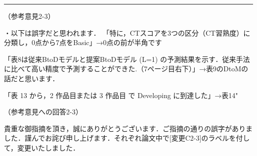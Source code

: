 \documentclass{jarticle} %
\def\subsection#1{ \vspace{1pc} {\gt #1} }
\def\nextans{ \vspace{2pc} \hrule }
\begin{document}
\begin{description}
\begin{table}[h]
   \vspace{-2mm}
\end{table}

\end{description}

\newpage
\nextans
\subsection{（参考意見2-3）}

・以下は誤字だと思われます．
「特に，CTスコアを3つの区分（CT習熟度）に分類し，0点から7点をBasic」→0点の前が半角です

「表8は従来BtoDモデルと提案BtoDモデル (L=1) の予測結果を示す．従来手法に比べて高い精度で予測することができた.（7ページ目右下）」→表9のDtoMの話だと思います．

「表 13 から，2 作品目または 3 作品目 で Developing に到達した」→表14"

\subsection{（参考意見への回答2-3）}

貴重な御指摘を頂き，誠にありがとうございます．ご指摘の通りの誤字がありました．謹んでお詫び申し上げます．それぞれ論文中で[変更C2-3]のラベルを付して，変更いたしました．

	
\end{document}
